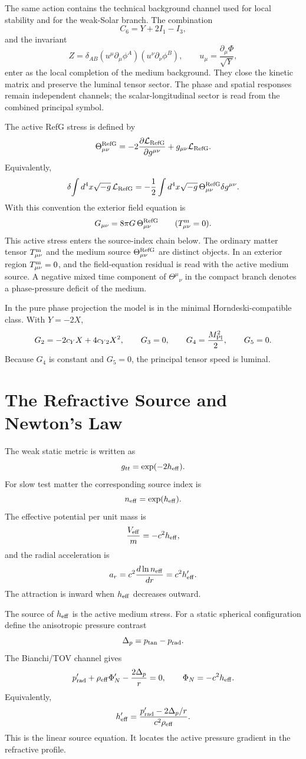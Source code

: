 \documentclass[12pt,a4paper]{article}
\begin{document}
The same action contains the technical background channel used for local stability and for the weak-Solar branch. The combination
\[
C_6=Y+2I_1-I_3,
\]
and the invariant
\[
Z=\delta_{AB}(u^\mu\partial_\mu\phi^A)(u^\nu\partial_\nu\phi^B),
\qquad
u_\mu=\frac{\partial_\mu\Phi}{\sqrt{Y}},
\]
enter as the local completion of the medium background. They close the kinetic matrix and preserve the luminal tensor sector.
The phase and spatial responses remain independent channels; the scalar-longitudinal sector is read from the combined principal symbol.

The active RefG stress is defined by
\[
\Theta^{\rm RefG}_{\mu\nu}
=-2\frac{\partial\mathcal L_{\rm RefG}}{\partial g^{\mu\nu}}
+g_{\mu\nu}\mathcal L_{\rm RefG}.
\]
Equivalently,
\[
\delta\!\int d^4x\sqrt{-g}\,\mathcal L_{\rm RefG}
=-\frac12\int d^4x\sqrt{-g}\,
\Theta^{\rm RefG}_{\mu\nu}\delta g^{\mu\nu}.
\]
With this convention the exterior field equation is
\[
G_{\mu\nu}=8\pi G\,\Theta^{\rm RefG}_{\mu\nu}
\qquad (T_{\mu\nu}^{\rm m}=0).
\]
This active stress enters the source-index chain below. The ordinary matter tensor $T_{\mu\nu}^{\rm m}$ and the medium source $\Theta_{\mu\nu}^{\rm RefG}$ are distinct objects. In an exterior region $T_{\mu\nu}^{\rm m}=0$, and the field-equation residual is read with the active medium source. A negative mixed time component of $\Theta^\mu{}_\nu$ in the compact branch denotes a phase-pressure deficit of the medium.

In the pure phase projection the model is in the minimal Horndeski-compatible class. With $Y=-2X$,
\[
G_2=-2c_YX+4c_{Y2}X^2,\qquad
G_3=0,\qquad
G_4=\frac{M_{\rm Pl}^2}{2},\qquad
G_5=0.
\]
Because $G_4$ is constant and $G_5=0$, the principal tensor speed is luminal.

\section{The Refractive Source and Newton's Law}

The weak static metric is written as
\[
g_{tt}=\exp(-2h_{\rm eff}).
\]
For slow test matter the corresponding source index is
\[
n_{\rm eff}=\exp(h_{\rm eff}).
\]
The effective potential per unit mass is
\[
\frac{V_{\rm eff}}{m}=-c^2h_{\rm eff},
\]
and the radial acceleration is
\[
a_r=c^2\frac{d\ln n_{\rm eff}}{dr}
=c^2h_{\rm eff}'.
\]
The attraction is inward when $h_{\rm eff}$ decreases outward.

The source of $h_{\rm eff}$ is the active medium stress. For a static spherical configuration define the anisotropic pressure contrast
\[
\Delta_p=p_{\rm tan}-p_{\rm rad}.
\]
The Bianchi/TOV channel gives
\[
p_{\rm rad}'+\rho_{\rm eff}\Phi_N'
-\frac{2\Delta_p}{r}=0,
\qquad
\Phi_N=-c^2h_{\rm eff}.
\]
Equivalently,
\[
h_{\rm eff}'=
\frac{p_{\rm rad}'-2\Delta_p/r}{c^2\rho_{\rm eff}}.
\]
This is the linear source equation. It locates the active pressure gradient in the refractive profile.
\end{document}
